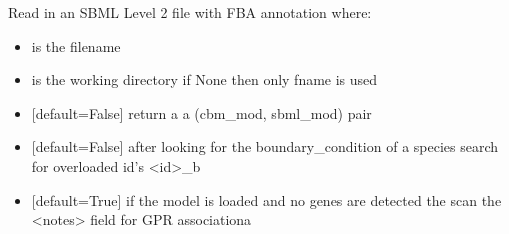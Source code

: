 \documentclass[letterpaper,10pt,english]{sphinxmanual}
\begin{document}
\begin{fulllineitems}
\label{\detokenize{modules_doc:cbmpy.CBRead.readSBML2FBA}}
\pysigstartsignatures
{}
\pysigstopsignatures
\sphinxAtStartPar
Read in an SBML Level 2 file with FBA annotation where:
\begin{itemize}
\item {} 
\sphinxAtStartPar
{} is the filename

\item {} 
\sphinxAtStartPar
{} is the working directory if None then only fname is used

\item {} 
\sphinxAtStartPar
{} {[}default=False{]} return a a (cbm\_mod, sbml\_mod) pair

\item {} 
\sphinxAtStartPar
{} {[}default=False{]} after looking for the boundary\_condition of a species search for overloaded id’s \textless{}id\textgreater{}\_b

\item {} 
\sphinxAtStartPar
{} {[}default=True{]} if the model is loaded and no genes are detected the scan the \textless{}notes\textgreater{} field for GPR associationa

\end{itemize}

\end{fulllineitems}

\end{document}
